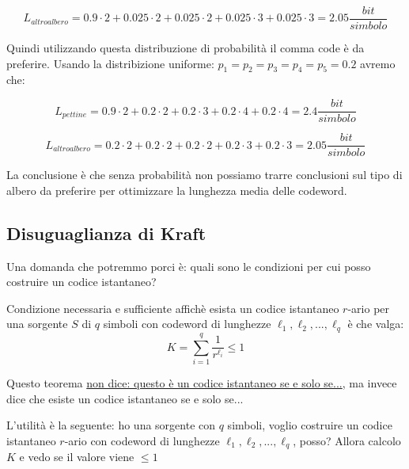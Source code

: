\begin{equation*}
L_{altroalbero} = 0.9 \cdot 2 + 0.025 \cdot 2 + 0.025 \cdot 2 + 0.025 \cdot 3 + 0.025 \cdot 3 = 2.05\frac{bit}{simbolo}
\end{equation*}

Quindi utilizzando questa distribuzione di probabilità il comma code è da preferire.
Usando la distribizione uniforme: $p_1 = p_2 = p_3 = p_4 = p_5 =  0.2$ avremo che:

\begin{equation*}
L_{pettine} = 0.9 \cdot 2 + 0.2 \cdot 2 + 0.2 \cdot 3 + 0.2 \cdot 4 + 0.2 \cdot 4 = 2.4\frac{bit}{simbolo}
\end{equation*}

\begin{equation*}
L_{altroalbero} = 0.2 \cdot 2 + 0.2 \cdot 2 + 0.2 \cdot 2 + 0.2 \cdot 3 + 0.2 \cdot 3 = 2.05\frac{bit}{simbolo}
\end{equation*}

La conclusione è che senza probabilità non possiamo trarre conclusioni sul tipo di albero da preferire per ottimizzare la lunghezza media delle codeword.


\subsection*{Disuguaglianza di Kraft}

Una domanda che potremmo porci è: quali sono le condizioni per cui posso costruire un codice istantaneo?

\begin{theorem}
Condizione necessaria e sufficiente affichè esista un codice istantaneo $r$-ario per una sorgente $S$ di $q$ simboli con codeword di lunghezze $\ell_1,\ell_2,...,\ell_q$ è che valga:
\begin{equation}
K = \sum_{i=1}^{q}\frac{1}{r^{\ell_i}} \leq 1
\end{equation}
\end{theorem}

Questo teorema \underline{non dice: questo è un codice istantaneo se e solo se...}, ma invece dice che esiste un codice istantaneo se e solo se...

L'utilità è la seguente: ho una sorgente con $q$ simboli, voglio costruire un codice istantaneo $r$-ario con codeword di lunghezze $\ell_1,\ell_2,...,\ell_q$, posso? Allora calcolo $K$ e vedo se il valore viene $\leq 1$

